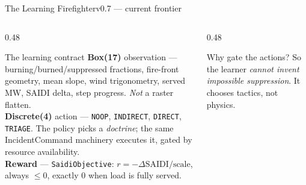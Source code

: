 \documentclass[aspectratio=169,9pt]{beamer}
\newcommand{\code}[1]{{\small\texttt{#1}}}
\newcommand{\gold}[1]{{\color{cslaeaglegold}\textbf{#1}}}
\begin{document}
\begin{frame}{The Learning Firefighter}{v0.7 --- current frontier}
  \centering
  \vskip8pt
  \begin{columns}[T,onlytextwidth]
    \begin{column}{0.48\textwidth}
      \begin{block}{The learning contract}
        \small
        \gold{Box(17)} observation --- burning/burned/suppressed fractions,
        fire-front geometry, mean slope, wind trigonometry, served MW,
        SAIDI delta, step progress. \emph{Not} a raster flatten.\\[4pt]
        \gold{Discrete(4)} action --- \code{NOOP}, \code{INDIRECT},
        \code{DIRECT}, \code{TRIAGE}. The policy picks a \emph{doctrine};
        the same IncidentCommand machinery executes it, gated by resource
        availability.\\[4pt]
        \gold{Reward} --- \code{SaidiObjective}:
        $r = -\Delta\mathrm{SAIDI}/\text{scale}$, always $\le 0$, exactly
        $0$ when load is fully served.
      \end{block}
    \end{column}
    \begin{column}{0.48\textwidth}
      \begin{block}{Why gate the actions?}
        \small So the learner \emph{cannot invent impossible suppression}.
        It chooses tactics, not physics.

\end{block}
\end{column}
\end{columns}
\end{frame}
\end{document}
